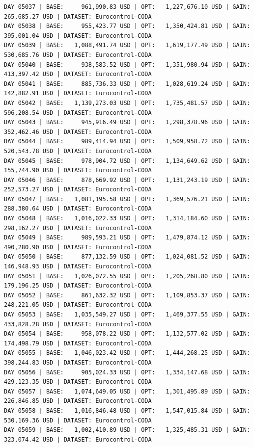 \documentclass[11pt,a4paper]{article}
\begin{document}
\begin{verbatim}
DAY 05037 | BASE:     961,990.83 USD | OPT:   1,227,676.10 USD | GAIN: 265,685.27 USD | DATASET: Eurocontrol-CODA
DAY 05038 | BASE:     955,423.77 USD | OPT:   1,350,424.81 USD | GAIN: 395,001.04 USD | DATASET: Eurocontrol-CODA
DAY 05039 | BASE:   1,088,491.74 USD | OPT:   1,619,177.49 USD | GAIN: 530,685.76 USD | DATASET: Eurocontrol-CODA
DAY 05040 | BASE:     938,583.52 USD | OPT:   1,351,980.94 USD | GAIN: 413,397.42 USD | DATASET: Eurocontrol-CODA
DAY 05041 | BASE:     885,736.33 USD | OPT:   1,028,619.24 USD | GAIN: 142,882.91 USD | DATASET: Eurocontrol-CODA
DAY 05042 | BASE:   1,139,273.03 USD | OPT:   1,735,481.57 USD | GAIN: 596,208.54 USD | DATASET: Eurocontrol-CODA
DAY 05043 | BASE:     945,916.49 USD | OPT:   1,298,378.96 USD | GAIN: 352,462.46 USD | DATASET: Eurocontrol-CODA
DAY 05044 | BASE:     989,414.94 USD | OPT:   1,509,958.72 USD | GAIN: 520,543.78 USD | DATASET: Eurocontrol-CODA
DAY 05045 | BASE:     978,904.72 USD | OPT:   1,134,649.62 USD | GAIN: 155,744.90 USD | DATASET: Eurocontrol-CODA
DAY 05046 | BASE:     878,669.92 USD | OPT:   1,131,243.19 USD | GAIN: 252,573.27 USD | DATASET: Eurocontrol-CODA
DAY 05047 | BASE:   1,081,195.58 USD | OPT:   1,369,576.21 USD | GAIN: 288,380.64 USD | DATASET: Eurocontrol-CODA
DAY 05048 | BASE:   1,016,022.33 USD | OPT:   1,314,184.60 USD | GAIN: 298,162.27 USD | DATASET: Eurocontrol-CODA
DAY 05049 | BASE:     989,593.21 USD | OPT:   1,479,874.12 USD | GAIN: 490,280.90 USD | DATASET: Eurocontrol-CODA
DAY 05050 | BASE:     877,132.59 USD | OPT:   1,024,081.52 USD | GAIN: 146,948.93 USD | DATASET: Eurocontrol-CODA
DAY 05051 | BASE:   1,026,072.55 USD | OPT:   1,205,268.80 USD | GAIN: 179,196.25 USD | DATASET: Eurocontrol-CODA
DAY 05052 | BASE:     861,632.32 USD | OPT:   1,109,853.37 USD | GAIN: 248,221.05 USD | DATASET: Eurocontrol-CODA
DAY 05053 | BASE:   1,035,549.27 USD | OPT:   1,469,377.55 USD | GAIN: 433,828.28 USD | DATASET: Eurocontrol-CODA
DAY 05054 | BASE:     958,078.22 USD | OPT:   1,132,577.02 USD | GAIN: 174,498.79 USD | DATASET: Eurocontrol-CODA
DAY 05055 | BASE:   1,046,023.42 USD | OPT:   1,444,268.25 USD | GAIN: 398,244.83 USD | DATASET: Eurocontrol-CODA
DAY 05056 | BASE:     905,024.33 USD | OPT:   1,334,147.68 USD | GAIN: 429,123.35 USD | DATASET: Eurocontrol-CODA
DAY 05057 | BASE:   1,074,649.05 USD | OPT:   1,301,495.89 USD | GAIN: 226,846.85 USD | DATASET: Eurocontrol-CODA
DAY 05058 | BASE:   1,016,846.48 USD | OPT:   1,547,015.84 USD | GAIN: 530,169.36 USD | DATASET: Eurocontrol-CODA
DAY 05059 | BASE:   1,002,410.89 USD | OPT:   1,325,485.31 USD | GAIN: 323,074.42 USD | DATASET: Eurocontrol-CODA

\end{verbatim}
\end{document}
